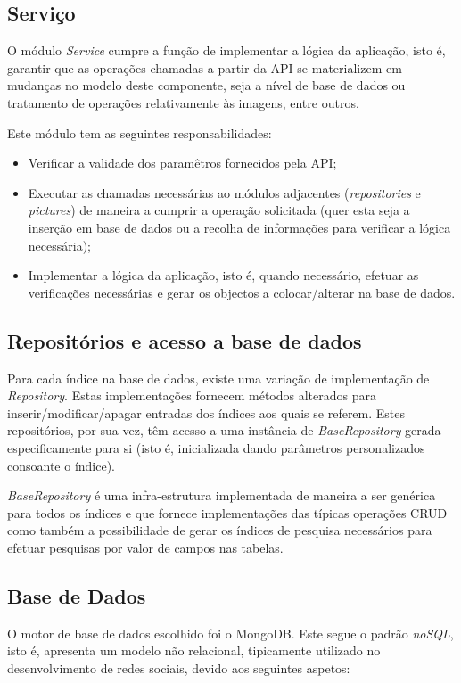\newpage

\subsection{Serviço}
O módulo \textit{Service} cumpre a função de implementar a lógica da aplicação, isto é, garantir que as operações chamadas a partir da API se materializem em mudanças no modelo deste componente, seja a nível de base de dados ou tratamento de operações relativamente às imagens, entre outros. \par \medskip

Este módulo tem as seguintes responsabilidades:
\begin{itemize}
	\item Verificar a validade dos paramêtros fornecidos pela API;
	\item Executar as chamadas necessárias ao módulos adjacentes (\textit{repositories} e \textit{pictures}) de maneira a cumprir a operação solicitada (quer esta seja a inserção em base de dados ou a recolha de informações para verificar a lógica necessária);
	\item Implementar a lógica da aplicação, isto é, quando necessário, efetuar as verificações necessárias e gerar os objectos a colocar/alterar na base de dados.
\end{itemize}

\subsection{Repositórios e acesso a base de dados}
Para cada índice na base de dados, existe uma variação de implementação de \textit{Repository}. Estas implementações fornecem métodos alterados para inserir/modificar/apagar entradas dos índices aos quais se referem. Estes repositórios, por sua vez, têm acesso a uma instância de \textit{BaseRepository} gerada especificamente para si (isto é, inicializada dando parâmetros personalizados consoante o índice). \par \medskip

\textit{BaseRepository} é uma infra-estrutura implementada de maneira a ser genérica para todos os índices e que fornece implementações das típicas operações CRUD como também a possibilidade de gerar os índices de pesquisa necessários para efetuar pesquisas por valor de campos nas tabelas. \par \medskip

\subsection{Base de Dados}
O motor de base de dados escolhido foi o MongoDB. Este segue o padrão \textit{noSQL}, isto é, apresenta um modelo não relacional, tipicamente utilizado no desenvolvimento de redes sociais, devido aos seguintes aspetos:


